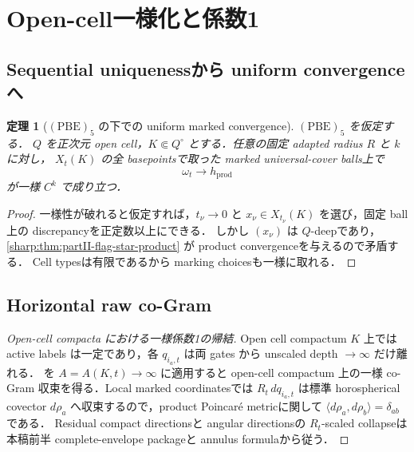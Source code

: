 \documentclass[a4paper,11pt]{ltjsarticle}
\numberwithin{equation}{section}
\theoremstyle{plain}
\newtheorem{theorem}{定理}[section]
\theoremstyle{definition}
\theoremstyle{remark}
\begin{document}
\section{Open-cell一様化と係数1}\label{sharp:sec:actual-localization}

\subsection{Sequential uniquenessから uniform convergenceへ}

\begin{theorem}[$\mathrm{(PBE)}_5$ の下での uniform marked convergence]\label{sharp:thm:uniform-marked}
$\mathrm{(PBE)}_5$ を仮定する．
$Q$ を正次元 open cell，$K\Subset Q^\circ$ とする．任意の固定 adapted radius $R$ と $k$ に対し，
$X_t(K)$ の全 basepointsで取った marked universal-cover balls上で
\begin{equation}\label{sharp:eq:uniform-product-convergence}
 \omega_t\longrightarrow h_{\mathrm{prod}}
\end{equation}
が一様 $C^k$ で成り立つ．
\end{theorem}

\begin{proof}
一様性が破れると仮定すれば，$t_\nu\to0$ と $x_\nu\in X_{t_\nu}(K)$ を選び，固定 ball上の discrepancyを正定数以上にできる．
しかし $(x_\nu)$ は $Q$-deepであり，\cref{sharp:thm:partII-flag-star-product} が product convergenceを与えるので矛盾する．
Cell typesは有限であるから marking choicesも一様に取れる．
\end{proof}

\subsection{Horizontal raw co-Gram}

\begin{proof}[Open-cell compacta における一様係数1の帰結]
Open cell compactum $K$ 上では active labels は一定であり，各 $q_{i_a,t}$ は両 gates から unscaled depth $\to\infty$ だけ離れる．
 を $A=A(K,t)\to\infty$ に適用すると
open-cell compactum 上の一様 co-Gram 収束を得る．Local marked coordinatesでは
$R_t\,dq_{i_a,t}$ は標準 horospherical covector $d\rho_a$ へ収束するので，product Poincar\'e metricに関して
$\langle d\rho_a,d\rho_b\rangle=\delta_{ab}$ である．
Residual compact directionsと angular directionsの $R_t$-scaled collapseは 本稿前半 complete-envelope packageと annulus formulaから従う．
\end{proof}
\end{document}
